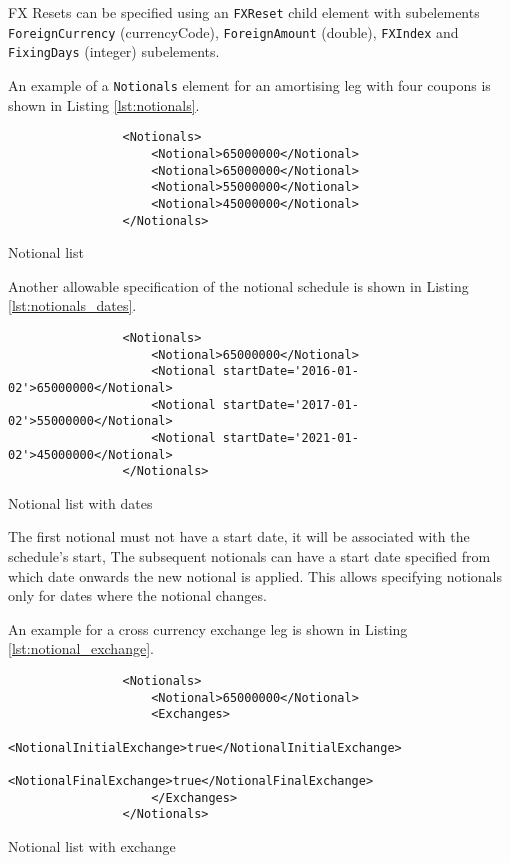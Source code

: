 \begin{itemize}
FX Resets can be specified using an \lstinline!FXReset! child element with subelements \break
\lstinline!ForeignCurrency! (currencyCode), \lstinline!ForeignAmount! (double), \lstinline!FXIndex! and \break
\lstinline!FixingDays! (integer) subelements.

\vspace{1em}

An example of a \lstinline!Notionals! element for an amortising leg with four coupons is shown in Listing \ref{lst:notionals}.
\begin{listing}[H]
\begin{verbatim}
                <Notionals>
                    <Notional>65000000</Notional>
                    <Notional>65000000</Notional>
                    <Notional>55000000</Notional>
                    <Notional>45000000</Notional>
                </Notionals>
\end{verbatim}
\caption{Notional list}
\label{lst:notionals}
\end{listing}

Another allowable specification of the notional schedule is shown in Listing \ref{lst:notionals_dates}. 
\begin{listing}[H]
\begin{verbatim}
                <Notionals>
                    <Notional>65000000</Notional>
                    <Notional startDate='2016-01-02'>65000000</Notional>
                    <Notional startDate='2017-01-02'>55000000</Notional>
                    <Notional startDate='2021-01-02'>45000000</Notional>
                </Notionals>
\end{verbatim}
\caption{Notional list with dates}
\label{lst:notionals_dates}
\end{listing}
The first notional must not have a start date, it will be associated
with the schedule's start, The subsequent notionals can have a start
date specified from which date onwards the new notional is applied. This allows
specifying notionals only for dates where the notional changes.

An example for a cross currency exchange leg is shown in Listing \ref{lst:notional_exchange}.
\begin{listing}[H]
\begin{verbatim}
                <Notionals>
                    <Notional>65000000</Notional>
                    <Exchanges>
                      <NotionalInitialExchange>true</NotionalInitialExchange>
                      <NotionalFinalExchange>true</NotionalFinalExchange>
                    </Exchanges>
                </Notionals>
\end{verbatim}
\caption{Notional list with exchange}
\label{lst:notional_exchange}
\end{listing}



\end{itemize}
